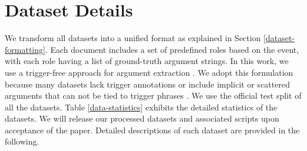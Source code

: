 \section{Dataset Details}

\label{appendix: data-info}
We transform all datasets into a unified format as explained in Section \ref{dataset-formatting}. Each document includes a set of predefined roles based on the event, with each role having a list of ground-truth argument strings. In this work, we use a trigger-free approach for argument extraction \cite{tong-etal-2022-docee}. We adopt this formulation because many datasets lack trigger annotations or include implicit or scattered arguments that can not be tied to trigger phrases \cite{sharif-etal-2024-explicit}. We use the official test split of all the datasets. Table \ref{data-statistics} exhibits the detailed statistics of the datasets. We will release our processed datasets and associated scripts upon acceptance of the paper. Detailed descriptions of each dataset are provided in the following.

